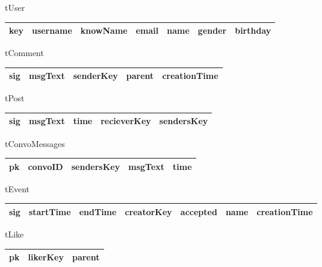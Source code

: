 tUser
\begin{center}
    \begin{tabular}{ | l | l | l | l | l | l | l |}
    \hline
    key & username & knowName & email & name & gender & birthday \\ \hline
    \end{tabular}
\end{center}

tComment
\begin{center}
    \begin{tabular}{ | l | l | l | l | l |}
    \hline
    sig & msgText & senderKey & parent & creationTime \\ \hline
    \end{tabular}
\end{center}

tPost
\begin{center}
    \begin{tabular}{ | l | l | l | l | l |}
    \hline
    sig & msgText & time & recieverKey & sendersKey  \\ \hline
    \end{tabular}
\end{center}

tConvoMessages
\begin{center}
    \begin{tabular}{ | l | l | l | l | l |}
    \hline
    pk & convoID & sendersKey & msgText & time\\ \hline
    \end{tabular}
\end{center}

tEvent
\begin{center}
    \begin{tabular}{ | l | l | l | l | l | l | l |}
    \hline
    sig & startTime & endTime & creatorKey & accepted & name & creationTime \\ \hline
    \end{tabular}
\end{center}

tLike
\begin{center}
    \begin{tabular}{ | l | l | l |}
    \hline
    pk & likerKey & parent \\ \hline
    \end{tabular}
\end{center}

\clearpage

